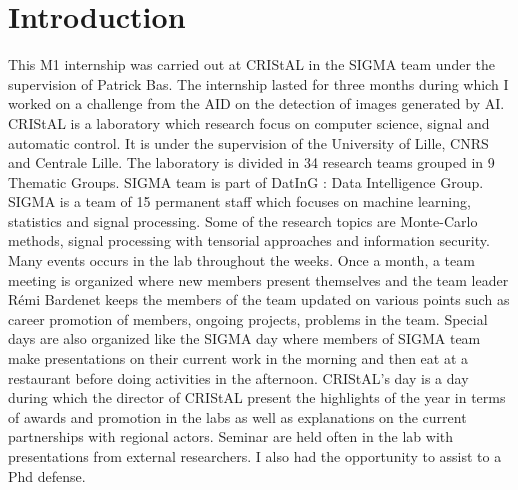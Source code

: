 \documentclass[12pt,a4paper]{article}
\begin{document}
\section*{Introduction}
This M1 internship was carried out at CRIStAL in the SIGMA team under the supervision of Patrick Bas. The internship lasted for three months during which I worked on a challenge from the AID on the detection of images generated by AI.\\
CRIStAL is a laboratory which research focus on computer science, signal and automatic control. It is under the supervision of the University of Lille, CNRS and Centrale Lille. The laboratory is divided in 34 research teams grouped in 9 Thematic Groups. SIGMA team is part of DatInG : Data Intelligence Group. SIGMA is a team of 15 permanent staff which focuses on machine learning, statistics and signal processing. Some of the research topics are Monte-Carlo methods, signal processing with tensorial approaches and information security.\\
Many events occurs in the lab throughout the weeks. Once a month, a team meeting is organized where new members present themselves and the team leader Rémi Bardenet keeps the members of the team updated on various points such as career promotion of members, ongoing projects, problems in the team. Special days are also organized like the SIGMA day where members of SIGMA team make presentations on their current work in the morning and then eat at a restaurant before doing activities in the afternoon. CRIStAL's day is a day during which the director of CRIStAL present the highlights of the year in terms of awards and promotion in the labs as well as explanations on the current partnerships with regional actors. Seminar are held often in the lab with presentations from external researchers. I also had the opportunity to assist to a Phd defense.\\
\end{document}
